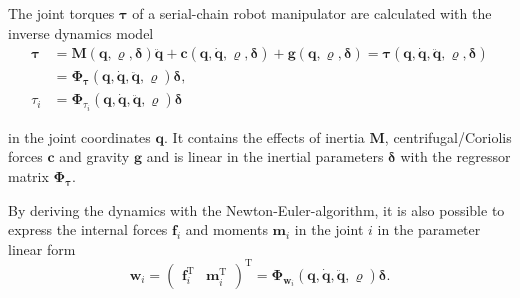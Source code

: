 \documentclass{svproc}
\newcommand{\bm}[1]{\boldsymbol{#1}}
\newcommand{\transp}[0]{{\mathrm{T}}}
\begin{document}
The joint torques $\bm{\tau}$ of a serial-chain robot manipulator are calculated with the inverse dynamics model
%
\begin{align}
\bm{\tau} 
&= 
\bm{M}(\bm{q},\bm{\varrho},\bm{\delta}) \ddot{\bm{q}}
+ \bm{c}(\bm{q},\dot{\bm{q}},\bm{\varrho},\bm{\delta})
+ \bm{g}(\bm{q},\bm{\varrho},\bm{\delta}) \label{equ:invdyn_normal} 
= \bm{\tau}(\bm{q},\dot{\bm{q}},\ddot{\bm{q}},\bm{\varrho},\bm{\delta})\\
&=
\bm{\Phi}_{\bm{\tau}}(\bm{q},\dot{\bm{q}},\ddot{\bm{q}},\bm{\varrho}) \bm{\delta},
\label{equ:invdyn_reg} \\
\tau_i 
&=
\bm{\Phi}_{\tau_i}(\bm{q},\dot{\bm{q}},\ddot{\bm{q}},\bm{\varrho}) \bm{\delta} \label{equ:invdyn_reg_single}
\end{align}
%

in the joint coordinates $\bm{q}$.
%
It contains the effects of inertia $\bm{M}$, centrifugal/Coriolis forces $\bm{c}$ and gravity $\bm{g}$ and is linear in the inertial parameters $\bm{\delta}$ with the regressor matrix $\bm{\Phi}_{\bm{\tau}}$.

By deriving the dynamics with the Newton-Euler-algorithm, it is also possible to express the internal forces $\bm{f}_i$ and moments $\bm{m}_i$ in the joint $i$ in the parameter linear form
\begin{equation}
\bm{w}_i = 
\begin{pmatrix} \bm{f}_i^\transp & \bm{m}_i^\transp\end{pmatrix}^\transp
=
\bm{\Phi}_{\bm{w}_i}(\bm{q},\dot{\bm{q}},\ddot{\bm{q}},\bm{\varrho}) \bm{\delta}.
\label{equ:joint_wrench}
\end{equation}

%
\end{document}
